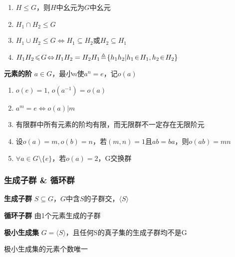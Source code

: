 \documentclass[a4paper,10pt]{ctexart}
\renewcommand*{\iff}{\Leftrightarrow}
\renewcommand*{\leq}{\leqslant}
\newcommand*{\gengroup}[1]{\langle #1 \rangle}
\begin{document}
\begin{multicols}{3}
    \begin{theorem}[子群运算律($H_1, H_2 \!\leq\! G$)]
        \hfil

        \begin{enumerate}
            \item $H \!\leq\! G$，则$H$中幺元为$G$中幺元
            \item $H_1 \!\cap\! H_2 \!\leq\! G$
            \item $H_1 \!\cup\! H_2 \!\leq\! G \!\iff\! H_1 \!\subseteq\! H_2 $或$H_2 \!\subseteq\! H_1$
            \item $H_1 H_2 \!\leq\! G \!\iff\! H_1 H_2 = H_2 H_1 \\ \!\triangleq\! \{h_1h_2 | h_1 \!\in\! H_1, h_2 \!\in\! H_2\}$
        \end{enumerate}
    \end{theorem}

    \textbf{元素的阶} $a \!\in\! G$，最小$n$使$a^n \!=\! e$，记$o(a)$

    \begin{theorem}[阶的性质]
        \hfil

        \begin{enumerate}
            \item $o(e) = 1$, $o(a^{-1}) = o(a)$
            \item $a^m = e \iff o(a) | m$
            \item 有限群中所有元素的阶均有限，而无限群不一定存在无限阶元
            \item 设$o(a) = m, o(b) = n$，若$(m, n) = 1$且$ab = ba$，则$o(ab) = mn$
            \item $\forall a \!\in\! G \!\setminus\! \{e\}$，若$o(a) = 2$，G交换群
        \end{enumerate}
    \end{theorem}

    \subsubsection{生成子群 \& 循环群}

    \textbf{生成子群} $S \!\subseteq\! G$，$G$中含$S$的子群交，$\gengroup{S}$

    \textbf{循环子群} 由1个元素生成的子群

    \textbf{极小生成集} $G \! = \! \gengroup{S}$，且任何S的真子集的生成子群均不是G

    极小生成集的元素个数唯一

    \begin{theorem}[循环群性质]
        \hfil


\end{theorem}
\end{multicols}
\end{document}

